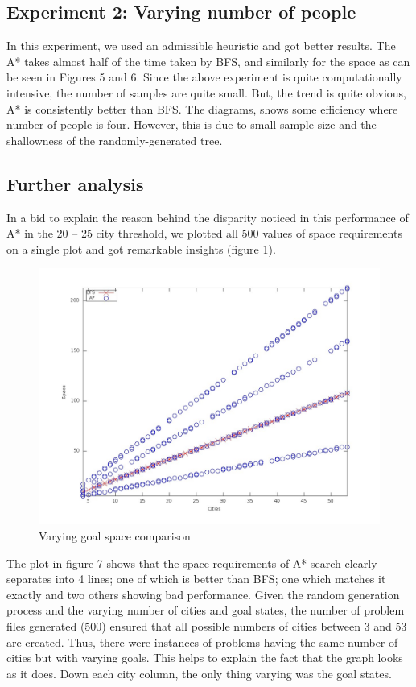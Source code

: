 \documentclass[letterpaper]{article}
\begin{document}
\subsection{Experiment 2: Varying number of people}
In this experiment, we used an admissible heuristic and got better results. The A* takes almost half of the time
taken by BFS, and similarly for the space as can be seen in Figures 5 and 6. Since the above experiment is quite computationally intensive, the number of samples
are quite small. But, the trend is quite obvious, A* is consistently better than BFS. The diagrams, shows some efficiency where
number of people is four. However, this is due to small sample size and the shallowness of the randomly-generated tree.

\subsection{Further analysis}
In a bid to explain the reason behind the disparity noticed in this performance of A* in the 20 – 25 city
threshold, we plotted all 500 values of space requirements on a single plot and got remarkable insights
(figure \ref{fig:500_varying_goal_compare_space}).

\begin{figure}[!htb]
	\centering
	\includegraphics[scale=0.22]{./pics/500_varying_goal_compare_space.jpg}
	\caption{Varying goal space comparison}
	\label{fig:500_varying_goal_compare_space}
\end{figure}
The plot in figure 7 shows that the space requirements of A* search clearly separates into 4 lines; one of which is better
than BFS; one which matches it exactly and two others showing bad performance.
Given the random generation process and the varying number of cities and goal states, the number of
problem files generated (500) ensured that all possible numbers of cities between 3 and 53 are created.
Thus, there were instances of problems having the same number of cities but with varying goals. This
helps to explain the fact that the graph looks as it does. Down each city column, the only thing varying
was the goal states.
\end{document}
